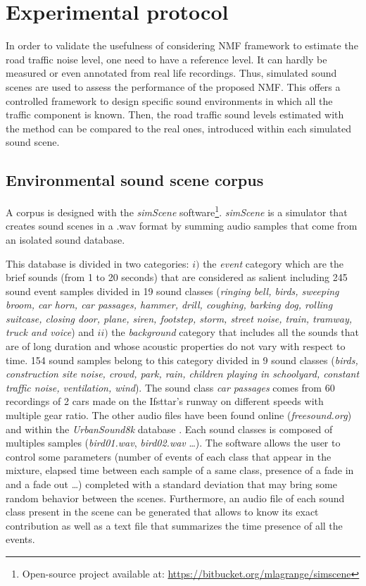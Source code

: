 \documentclass[twocolumn,a4paper,10pt]{article}
\begin{document}
\section{Experimental protocol}\label{part:protocol}

In order to validate the usefulness of considering NMF framework to estimate the road traffic noise level, one need to have a reference level. It can hardly be measured or even annotated from real life recordings. Thus,  simulated sound scenes are used to assess the performance of the proposed NMF. This offers a controlled framework to design specific sound environments in which all the traffic component is known. Then, the road traffic sound levels estimated with the method can be compared to the real ones, introduced within each simulated sound scene.

\subsection{Environmental sound scene corpus}

A corpus is designed with the \textit{simScene} software\footnote{Open-source project available at: \url{https://bitbucket.org/mlagrange/simscene}}. \textit{simScene} \cite{rossignol_simscene:_2015} is a simulator that creates sound scenes in a .wav format by summing audio samples that come from an isolated sound database.

This database is divided in two categories: $i)$ the \textit{event} category which are the brief sounds (from 1 to 20 seconds) that are considered as salient including 245 sound event samples divided in 19 sound classes (\textit{ringing bell, birds, sweeping broom, car horn, car passages, hammer, drill, coughing, barking dog, rolling suitcase, closing door, plane, siren, footstep, storm, street noise, train, tramway, truck and voice}) and $ii)$ the \textit{background} category that includes all the sounds that are of long duration and whose acoustic properties do not vary with respect to time. 154 sound samples belong to this category divided in 9 sound classes (\textit{birds, construction site noise, crowd, park, rain, children playing in schoolyard, constant traffic noise, ventilation, wind}). The sound class \textit{car passages} comes from 60 recordings of 2 cars made on the Ifsttar's runway on different speeds with multiple gear ratio. The other audio files have been found online (\textit{freesound.org}) and within the \textit{UrbanSound8k} database \cite{salamon_dataset_nodate}. Each sound classes is composed of multiples samples (\textit{bird01.wav}, \textit{bird02.wav} \dots).
The software allows the user to control some parameters (number of events of each class that appear in the mixture, elapsed time between each sample of a same class, presence of a fade in and a fade out \dots) completed with a standard deviation that may bring some random behavior between the scenes. Furthermore, an audio file of each sound class present in the scene can be generated that allows to know its exact contribution as well as a text file that summarizes the time presence of all the events.\\
\end{document}
